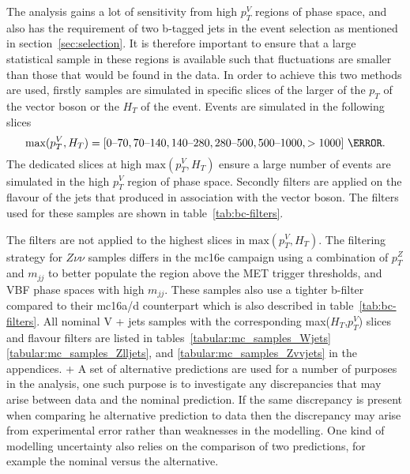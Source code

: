 The analysis gains a lot of sensitivity from high $p_T^V$ regions of phase
space, and also has the requirement of two b-tagged jets in the event selection
as mentioned in section~\ref{sec:selection}. It is therefore important to ensure
that a large statistical sample in these regions is available such that
fluctuations are smaller than those that would be found in the data. In order to
achieve this two methods are used, firstly samples are simulated in specific
slices of the larger of the $p_T$ of the vector boson or the $H_T$ of the event.
Events are simulated in the following slices
\begin{equation}
  \text{max}(p_T^V, H_T) = [0\text{--}70, 70\text{--}140, 140\text{--}280, 280\text{--}500, 500\text{--}1000, >1000]~\GeV.
\end{equation}
The dedicated slices at high $\text{max}(p_T^V, H_T)$ ensure a large number of
events are simulated in the high $p_T^V$ region of phase space. Secondly filters
are applied on the flavour of the jets that produced in association with the
vector boson.  The filters used for these samples are shown in
table~\ref{tab:bc-filters}.

The filters are not applied to the highest slices in $\text{max}(p_T^V, H_T)$.
The filtering strategy for $Z\nu\nu$ samples differs in the mc16e campaign using
a combination of $p_T^Z$ and $m_{jj}$ to better populate the region above the
MET trigger thresholds, and VBF phase spaces with high $m_{jj}$. These samples
also use a tighter b-filter compared to their mc16a/d counterpart which is also
described in table~\ref{tab:bc-filters}. All nominal V + jets samples with the
corresponding max($H_T$,$p_T^V$) slices and flavour filters are listed in
tables~\ref{tabular:mc_samples_Wjets} \ref{tabular:mc_samples_Zlljets}, and
\ref{tabular:mc_samples_Zvvjets} in the appendices.
+
A set of alternative predictions are used for a number of purposes in the
analysis, one such purpose is to investigate any discrepancies that may arise
between data and the nominal prediction. If the same discrepancy is present when
comparing he alternative prediction to data then the discrepancy may arise from
experimental error rather than weaknesses in the modelling. One kind of
modelling uncertainty also relies on the comparison of two predictions, for
example the nominal versus the alternative.

